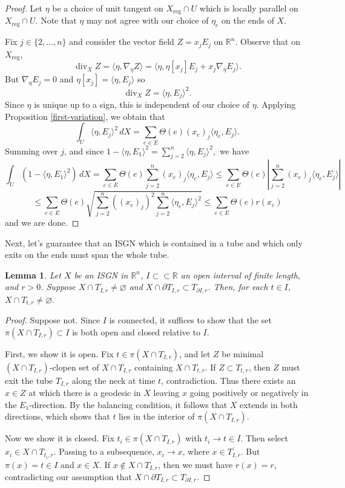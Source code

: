 \documentclass[11pt,reqno,twoside]{amsart}
\newcommand{\on}{\operatorname}
\newcommand{\divv}{\on{div}}
\newcommand{\reg}{\mathrm{reg}}
\newtheorem{lemma}{Lemma}
\theoremstyle{definition}
\begin{document}
\begin{proof}
    Let $\eta$ be a choice of unit tangent on $X_\reg \cap U$ which is locally parallel on $X_\reg \cap U$. Note that $\eta$ may not agree with our choice of $\eta_e$ on the ends of $X$.

    Fix $j \in \{2,\ldots,n\}$ and consider the vector field $Z = x_jE_j$ on $\mathbb{R}^n$. Observe that on $X_\reg$, 
    \[\divv_X Z = \langle \eta, \nabla_\eta Z\rangle = \langle \eta, \eta[x_j] E_j + x_j \nabla_\eta E_j\rangle.\]
    But $\nabla_\eta E_j = 0$ and $\eta[x_j] = \langle \eta,E_j\rangle$ so 
    \[\divv_X Z = \langle \eta,E_j\rangle^2.\]
    Since $\eta$ is unique up to a sign, this is independent of our choice of $\eta$. Applying Proposition \ref{first-variation}, we obtain that 
    \[\int_U \langle \eta,E_j\rangle^2 \, dX = \sum_{e \in E} \Theta(e) (x_e)_j \langle \eta_e,E_j\rangle.\]
    Summing over $j$, and since $1 - \langle \eta,E_1\rangle^2 = \sum_{j=2}^n \langle \eta,E_j\rangle^2,$ we have 
    \[\int_U (1 - \langle \eta,E_1\rangle^2) \, dX = \sum_{e \in E} \Theta(e) \sum_{j=2}^n (x_e)_j \langle \eta_e,E_j\rangle \leq \sum_{e \in E} \Theta(e) \left|\sum_{j=2}^n (x_e)_j \langle \eta_e,E_j\rangle\right| \]
    \[\leq \sum_{e \in E} \Theta(e) \sqrt{\sum_{j=2}^n ((x_e)_j)^2\sum_{j=2}^n \langle \eta_e, E_j\rangle^2} \leq \sum_{e \in E} \Theta(e) r(x_e)\]
    and we are done.
\end{proof}

Next, let's guarantee that an ISGN which is contained in a tube and which only exits on the ends must span the whole tube.

\begin{lemma} \label{spans-tube}
Let $X$ be an ISGN in $\mathbb{R}^n$, $I \subset \subset \mathbb{R}$ an open interval of finite length, and $r > 0$. Suppose $X \cap T_{I,r} \neq \varnothing$ and $X \cap \partial T_{I,r} \subset T_{\partial I, r}$. Then, for each $t \in I$, $X \cap T_{t,r} \neq \varnothing$.  
\end{lemma}
\begin{proof}
    Suppose not. Since $I$ is connected, it suffices to show that the set $\pi(X \cap T_{I,r}) \subset I$ is both open and closed relative to $I$.
    
First, we show it is open. Fix $t \in \pi(X \cap T_{I,r})$, and let $Z$ be minimal $(X \cap T_{I,r})$-clopen set of $X \cap T_{I,r}$ containing $X \cap T_{t,r}$. If $Z \subset T_{t,r}$, then $Z$ must exit the tube $T_{I,r}$ along the neck at time $t$, contradiction. Thus there exists an $x \in Z$ at which there is a geodesic in $X$ leaving $x$ going positively or negatively in the $E_1$-direction. By the balancing condition, it follows that $X$ extends in both directions, which shows that $t$ lies in the interior of $\pi(X \cap T_{I,r})$.

Now we show it is closed. Fix $t_i \in \pi(X \cap T_{I,r})$ with $t_i \to t \in I$. Then select $x_i \in X \cap T_{t_i,r}$. Passing to a subsequence, $x_i \to x$, where $x \in \overline{T_{I,r}}$. But $\pi(x) = t \in I$ and $x \in X$. If $x \notin X \cap T_{I,r}$, then we must have $r(x)=r$, contradicting our assumption that $X \cap \partial T_{I,r} \subset T_{\partial I, r}$.
\end{proof}
\end{document}
